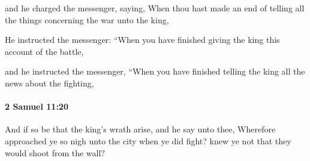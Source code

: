 			\begin{versebox}
					\item[BHS] 
					\item[ASV] and he charged the messenger, saying, When thou hast made an end of telling all the things concerning the war unto the king,
					\item[NIV] He instructed the messenger: “When you have finished giving the king this account of the battle,
					\item[NRSV] and he instructed the messenger, “When you have finished telling the king all the news about the fighting,
			\end{versebox}

		\paragraph{2 Samuel 11:20} %
			\label{2SAMUEL-11-20}

			And if so be that the king’s wrath arise, and he say unto thee, Wherefore approached ye so nigh unto the city when ye did fight? knew ye not that they would shoot from the wall?

